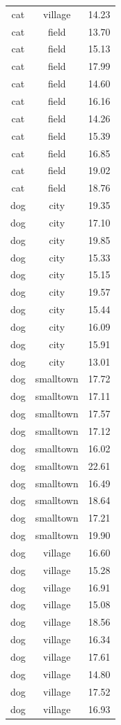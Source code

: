\documentclass[
  letterpaper,
]{scrbook}
\begin{document}
\begin{longtable}[]{@{}ccc@{}}
cat & village & 14.23 \\
cat & field & 13.70 \\
cat & field & 15.13 \\
cat & field & 17.99 \\
cat & field & 14.60 \\
cat & field & 16.16 \\
cat & field & 14.26 \\
cat & field & 15.39 \\
cat & field & 16.85 \\
cat & field & 19.02 \\
cat & field & 18.76 \\
dog & city & 19.35 \\
dog & city & 17.10 \\
dog & city & 19.85 \\
dog & city & 15.33 \\
dog & city & 15.15 \\
dog & city & 19.57 \\
dog & city & 15.44 \\
dog & city & 16.09 \\
dog & city & 15.91 \\
dog & city & 13.01 \\
dog & smalltown & 17.72 \\
dog & smalltown & 17.11 \\
dog & smalltown & 17.57 \\
dog & smalltown & 17.12 \\
dog & smalltown & 16.02 \\
dog & smalltown & 22.61 \\
dog & smalltown & 16.49 \\
dog & smalltown & 18.64 \\
dog & smalltown & 17.21 \\
dog & smalltown & 19.90 \\
dog & village & 16.60 \\
dog & village & 15.28 \\
dog & village & 16.91 \\
dog & village & 15.08 \\
dog & village & 18.56 \\
dog & village & 16.34 \\
dog & village & 17.61 \\
dog & village & 14.80 \\
dog & village & 17.52 \\
dog & village & 16.93 \\

\end{longtable}
\end{document}
